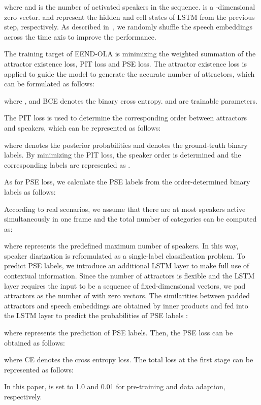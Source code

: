 \documentclass{article}
\begin{document}
where  and  is the number of activated speakers in the sequence.  is a -dimensional zero vector.  and  represent the hidden and cell states of LSTM from the previous step, respectively. As described in~\cite{EEND_EDA}, we randomly shuffle the speech embeddings across the time axis to improve the performance.

The training target of EEND-OLA is minimizing the weighted summation of the attractor existence loss, PIT loss and PSE loss. The attractor existence loss is applied to guide the model to generate the accurate number of attractors, which can be formulated as follows:

where ,  and BCE denotes the binary cross entropy.  and  are trainable parameters.

The PIT loss is used to determine the corresponding order between attractors and speakers, which can be represented as follows:

where  denotes the posterior probabilities and  denotes the ground-truth binary labels. By minimizing the PIT loss, the speaker order is determined and the corresponding labels are represented as .

As for PSE loss, we calculate the PSE labels from the order-determined binary labels  as follows:

According to real scenarios, we assume that there are at most  speakers active simultaneously in one frame and the total number of categories can be computed as:

where  represents the predefined maximum number of speakers.
In this way, speaker diarization is reformulated as a single-label classification problem. To predict PSE labels, we introduce an additional LSTM layer to make full use of contextual information. Since the number of attractors is flexible and the LSTM layer requires the input to be a sequence of fixed-dimensional vectors, we pad attractors as the number of  with zero vectors. The similarities between padded attractors and speech embeddings are obtained by inner products and fed into the LSTM layer to predict the probabilities of PSE labels : 

where  represents the prediction of PSE labels. Then, the PSE loss can be obtained as follows:

where CE denotes the cross entropy loss.
The total loss at the first stage can be represented as follows:

In this paper,  is set to 1.0 and 0.01 for pre-training and data adaption, respectively.
\end{document}
